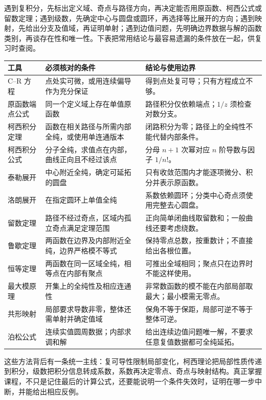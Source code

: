\documentclass[UTF8,12pt,a4paper,fontset=fandol]{ctexbook}
\begin{document}
遇到复积分，先标出定义域、奇点与路径方向，再决定能否用原函数、柯西公式或留数定理；遇到级数，先确定中心与圆盘或圆环，再选择等比展开的方向；遇到映射，先给出分支及值域，再证明单射；遇到边值问题，先明确边界数据与解的函数类别，再谈存在性和唯一性。下表把常用结论与最容易遗漏的条件放在一起，供复习时查阅。

\begin{longtable}{@{}p{}p{}p{}@{}}
\toprule
工具 & 必须核对的条件 & 结论与使用边界 \\
\midrule
\endhead
C--R 方程 & 点处实可微，或用连续偏导作为充分保证 & 得到点处复可导；只有方程成立不够。 \\
原函数端点公式 & 同一个定义域上存在单值原函数 & 路径积分仅依赖端点；$1/z$ 须检查对数分支。 \\
柯西积分定理 & 函数在相关路径与所需内部全纯，或使用单连通版本 & 闭路积分为零；路径上的全纯性不能代替内部条件。 \\
柯西积分公式 & 分子全纯，求值点在内部，曲线正向且不经过该点 & 分母 $n+1$ 次幂对应 $n$ 阶导数与因子 $1/n!$。 \\
泰勒展开 & 中心附近全纯，确定可延拓的圆盘 & 只有收敛范围内才能逐项微分、积分并表示原函数。 \\
洛朗展开 & 在指定圆环上单值全纯 & 系数依赖圆环；分类中心奇点须使用完整去心圆盘。 \\
留数定理 & 路径不经过奇点，区域内孤立奇点满足定理范围 & 正向简单闭曲线取留数和；一般曲线还要考虑绕数。 \\
鲁歇定理 & 两函数在边界及内部附近全纯，边界严格模不等式 & 保持零点总数，按重数计；不直接给出各根位置。 \\
恒等定理 & 两函数在同一区域全纯，相等点在内部有聚点 & 可推出全域相同；聚点只在边界时不能这样使用。 \\
最大模原理 & 开集上的全纯性及相应连通性 & 非常数函数的模不能在内部局部取最大；最小模需无零点。 \\
共形映射 & 局部要求导数非零，整体还需单射并确定值域 & 保角不等于保距，局部可逆不等于整体可逆。 \\
泊松公式 & 连续实值圆周数据；内部求调和解 & 给出连续边值问题唯一解，不要求任意复值数据都可全纯延拓。 \\
\bottomrule
\end{longtable}

这些方法背后有一条统一主线：复可导性限制局部变化，柯西理论把局部性质传递到积分，级数把积分信息转成系数，系数再决定零点、奇点与映射结构。真正掌握课程，不只是记住最后的计算公式，还要能说明一个条件失效时，证明在哪一步中断，并能给出相应反例。
\end{document}
